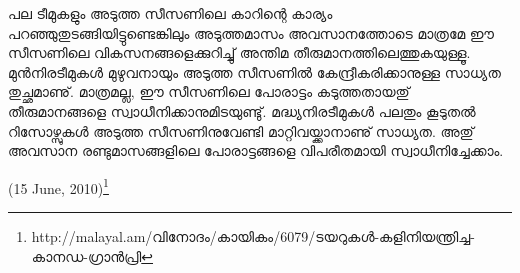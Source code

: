 പല ടീമുകളും അടുത്ത സീസണിലെ കാറിന്റെ കാര്യം പറഞ്ഞുതുടങ്ങിയിട്ടുണ്ടെങ്കിലും അടുത്തമാസം അവസാനത്തോടെ 
മാത്രമേ ഈ സീസണിലെ വികസനങ്ങളെക്കുറിച്ചു് അന്തിമ തീരുമാനത്തിലെത്തുകയുള്ളൂ. മുന്‍നിരടീമുകള്‍ മുഴുവനായും 
അടുത്ത സീസണില്‍ കേന്ദ്രീകരിക്കാനുള്ള സാധ്യത തുച്ഛമാണു്. മാത്രമല്ല, ഈ സീസണിലെ പോരാട്ടം കടുത്തതായതു് 
തീരുമാനങ്ങളെ സ്വാധീനിക്കാനുമിടയുണ്ടു്. മദ്ധ്യനിരടീമുകള്‍ പലതും കൂടുതല്‍ റിസോഴ്സുകള്‍ അടുത്ത സീസണിനുവേണ്ടി 
മാറ്റിവയ്ക്കാനാണു് സാധ്യത. അതു് അവസാന രണ്ടുമാസങ്ങളിലെ പോരാട്ടങ്ങളെ വിപരീതമായി സ്വാധീനിച്ചേക്കാം.

\begin{flushright}(15 June, 2010)\footnote{http://malayal.am/വിനോദം/കായികം/6079/ടയറുകള്‍-കളിനിയന്ത്രിച്ച-കാനഡ-ഗ്രാന്‍പ്രി}\end{flushright}

\newpage
